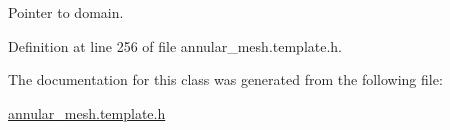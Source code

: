 Pointer to domain. 



Definition at line 256 of file annular\+\_\+mesh.\+template.\+h.



The documentation for this class was generated from the following file\+:\begin{DoxyCompactItemize}
\item 
\hyperlink{annular__mesh_8template_8h}{annular\+\_\+mesh.\+template.\+h}\end{DoxyCompactItemize}
